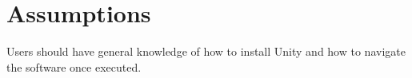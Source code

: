 \section{Assumptions}
\label{sec:assumptions}
Users should have general knowledge of how to install Unity and how to navigate the software once executed.

